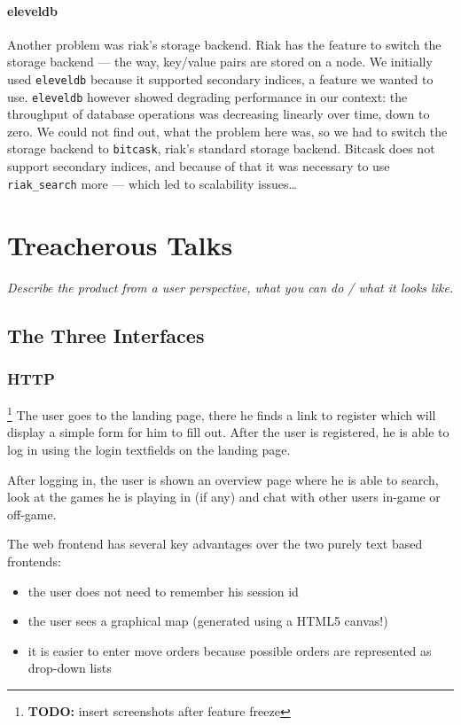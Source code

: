\documentclass[11pt,a4paper]{report}
\newcommand{\hi}[1]{{\color{red}\em #1\/}\\}
\newcommand{\todo}[1]{\footnote{{\color{red} {\bf TODO:} #1}}}
\begin{document}
\subsubsection{eleveldb}
Another problem was riak's storage backend. Riak has the feature to switch the
storage backend --- the way, key/value pairs are stored on a node.
We initially used {\tt eleveldb} because it supported secondary indices, a
feature we wanted to use. {\tt eleveldb} however showed degrading performance
in our context: the throughput of database operations was decreasing linearly
over time, down to zero. We could not find out, what the problem here was, so
we had to switch the storage backend to {\tt bitcask}, riak's standard storage
backend. Bitcask does not support secondary indices, and because of that it was
necessary to use {\tt riak\_search} more --- which led to scalability
issues\ldots

\chapter{Treacherous Talks}
\hi{Describe the product from a user perspective, what you can do / what it looks like.}
\section{The Three Interfaces}
\subsection{HTTP}
\todo{insert screenshots after feature freeze}
The user goes to the landing page, there he finds a link to register which will
display a simple form for him to fill out. After the user is registered, he is
able to log in using the login textfields on the landing page.

After logging in, the user is shown an overview page where he is able to search,
look at the games he is playing in (if any) and chat with other users in-game or
off-game.

The web frontend has several key advantages over the two purely text based
frontends:\\
\begin{itemize}
\item the user does not need to remember his session id
\item the user sees a graphical map (generated using a HTML5 canvas!)
\item it is easier to enter move orders because possible orders are represented
  as drop-down lists
\end{itemize}
\end{document}
